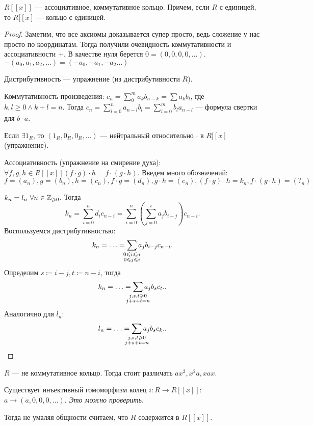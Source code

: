 \begin{theorem}
    $R[[x]]$ --- ассоциативное, коммутативное кольцо. Причем, если  $R$ с единицей, то  $R[[x]$ --- кольцо с единицей.
\end{theorem}
\begin{proof}
    Заметим, что все аксиомы доказывается супер просто, ведь сложение у нас просто по координатам. Тогда получили очевидность коммутативности и ассоциативности $+$. В качестве нуля берется  $0 =(0, 0, 0, 0,\ldots)$. $-(a_0, a_1,a_2,\ldots) = (-a_0, -a_1,-a_2\ldots)$

    Дистрибутивность --- упражнение (из дистрибутивности $R$).
    
    Коммутативность произведения: $c_n = \sum_0^m a_k b_{n-k} = \sum a_k b_l$, где  $k, l \ge 0 \land k+l=n$. Тогда $c_n = \sum_{l=0}^n a_{n-l} b_l = \sum_{l = 0}^m b_l a_{n-l}$ --- формула свертки для $b \cdot a$.

    Если  $\exists 1_R$, то  $(1_R, 0_R, 0_R, \ldots)$ --- нейтральный относительно $\cdot$ в  $R[[x]$ (упражнение).

    Ассоциативность (упражнение на смирение духа):  $\forall f, g, h \in R[[x]] (f\cdot g) \cdot h = f \cdot (g \cdot h)$. Введем много обозначений: $f=(a_n), g=(b_n), h=(c_n), f \cdot g = (d_n), g \cdot h = (e_n), (f \cdot g) \cdot h = k_n, f \cdot (g \cdot h) = (?_n)$

    $k_n = l_n\ \forall n \in \mathbb{Z}_{\geqslant 0}$. Тогда \[
        k_n = \sum_{i=0}^n d_i c_{n-i} = \sum_{i=0}^n (\sum_{j=0}^i a_jb_{i-j}) c_{n-i}
    .\]  
    Воспользуемся дистрибутивностью: \[
        k_n = \ldots = \sum_{\mathclap{\substack{0 \le i \le n \\ 0 \le j \le i}}} a_j b_{i-j} c_{n-i}
    .\] 
    Определим $s \coloneqq i - j, t \coloneqq n - i$, тогда  \[
    k_n = \ldots = \sum_{\mathclap{\substack{j, s, t \ge 0 \\ j+s+t = n}}} a_jb_sc_t.
    .\] 
    Аналогично для $l_n$:  \[
    l_n = \ldots = \sum_{\mathclap{\substack{j, s, t \ge 0 \\ j+s+t = n}}} a_jb_sc_k.
    .\] 
\end{proof}
\begin{remark}
   $R$ --- не коммутативное кольцо. Тогда стоит различать  $ax^2, x^2a, xax$. 
\end{remark}
\begin{remark}
    Существует инъективный гомоморфизм колец $i: R \to R[[x]]$: $a \to (a, 0, 0, 0,\ldots)$. \textit{Это можно проверить}. 

    Тогда не умаляя общности считаем, что $R$ содержится в  $R[[x]]$.
\end{remark}
